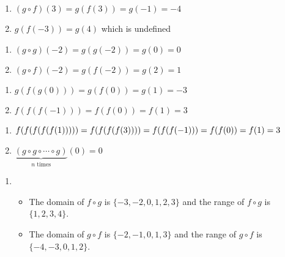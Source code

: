 \begin{multicols}{2}
\begin{enumerate}
\setcounter{enumi}{\value{HW}}

\item $(g \circ f)(3) = g(f(3)) = g(-1) = -4$
\item $g(f(-3)) = g(4)$ which is undefined

\setcounter{HW}{\value{enumi}}
\end{enumerate}
\end{multicols}

\begin{multicols}{2}
\begin{enumerate}
\setcounter{enumi}{\value{HW}}

\item $(g \circ g)(-2) = g(g(-2)) = g(0) = 0$
\item $(g \circ f)(-2) = g(f(-2)) = g(2) = 1$

\setcounter{HW}{\value{enumi}}
\end{enumerate}
\end{multicols}

\begin{multicols}{2}
\begin{enumerate}
\setcounter{enumi}{\value{HW}}

\item $g(f(g(0))) = g(f(0)) = g(1) = -3$
\item $f(f(f(-1))) = f(f(0)) = f(1) = 3$

\setcounter{HW}{\value{enumi}}
\end{enumerate}
\end{multicols}

\begin{multicols}{2}
\begin{enumerate}
\setcounter{enumi}{\value{HW}}

\item $f(f(f(f(f(1))))) = f(f(f(f(3)))) =\\ f(f(f(-1))) = f(f(0))  = f(1) = 3$
\item $\underbrace{(g \circ g \circ \cdots \circ g)}_{\mbox{$n$ times}}(0) = 0$

\setcounter{HW}{\value{enumi}}
\end{enumerate}
\end{multicols}

\begin{enumerate}
\setcounter{enumi}{\value{HW}}

\item  \begin{itemize}  \item  The domain of $f \circ g$ is $\{ -3, -2, 0, 1, 2, 3\}$ and the range of $f \circ g$ is $\{1, 2, 3, 4\}$.
\item The domain of $g \circ f$ is $\{ -2, -1, 0, 1, 3 \}$ and the range of $g \circ f$ is $\{ -4, -3, 0, 1, 2 \}$.

\end{itemize}

\setcounter{HW}{\value{enumi}}
\end{enumerate}


